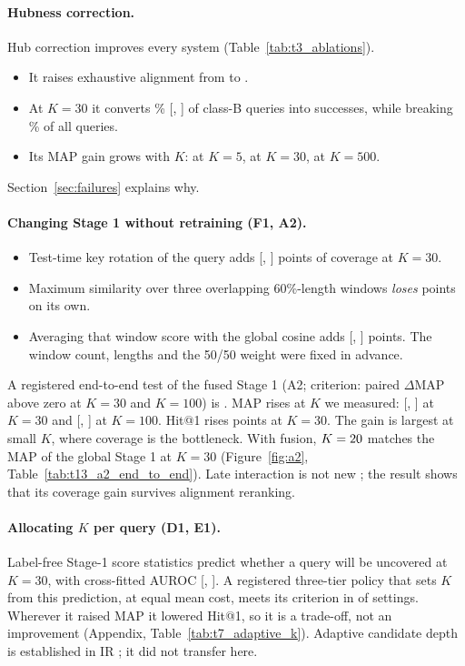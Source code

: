 \documentclass[10pt]{article}
\begin{document}
\paragraph{Hubness correction.} Hub correction improves every system (Table~\ref{tab:t3_ablations}).
\begin{itemize}
\item It raises exhaustive alignment from \ClassicalMap{} to \ClassicalHubMap.
\item At $K=30$ it converts \HubFixedShare\% [\HubFixedLo, \HubFixedHi] of class-B queries into successes, while breaking \HubBroken\% of all queries.
\item Its MAP gain grows with $K$: \HubGainFive{} at $K=5$, \HubGainThirty{} at $K=30$, \HubGainFiveHundred{} at $K=500$.
\end{itemize}
Section~\ref{sec:failures} explains why.

\paragraph{Changing Stage 1 without retraining (F1, A2).}
\begin{itemize}
\item Test-time key rotation of the query adds \FOneTtrThirty{} [\FOneTtrThirtyLo, \FOneTtrThirtyHi] points of coverage at $K=30$.
\item Maximum similarity over three overlapping 60\%-length windows \emph{loses} \FOneWinMaxThirty{} points on its own.
\item Averaging that window score with the global cosine adds \FOneFuseThirty{} [\FOneFuseThirtyLo, \FOneFuseThirtyHi] points. The window count, lengths and the 50/50 weight were fixed in advance.
\end{itemize}
A registered end-to-end test of the fused Stage 1 (A2; criterion: paired $\Delta$MAP above zero at $K=30$ and $K=100$) is \ATwoMeets.
MAP rises at \ATwoAllKPositive{} $K$ we measured: \ATwoApThirty{} [\ATwoApThirtyLo, \ATwoApThirtyHi] at $K=30$ and \ATwoApHundred{} [\ATwoApHundredLo, \ATwoApHundredHi] at $K=100$. Hit@1 rises \ATwoHitDThirty{} points at $K=30$.
The gain is largest at small $K$, where coverage is the bottleneck. With fusion, $K=20$ matches the MAP of the global Stage 1 at $K=30$ (Figure~\ref{fig:a2}, Table~\ref{tab:t13_a2_end_to_end}).
Late interaction is not new \citep{colbert,livi2026}; the result shows that its coverage gain survives alignment reranking.

\paragraph{Allocating $K$ per query (D1, E1).} Label-free Stage-1 score statistics predict whether a query will be uncovered at $K=30$, with cross-fitted AUROC \DOneAuroc{} [\DOneAurocLo, \DOneAurocHi].
A registered three-tier policy that sets $K$ from this prediction, at equal mean cost, meets its criterion in \EOneMeets{} of \EOneCells{} settings. Wherever it raised MAP it lowered Hit@1, so it is a trade-off, not an improvement (Appendix, Table~\ref{tab:t7_adaptive_k}). Adaptive candidate depth is established in IR \citep{culpepper2016}; it did not transfer here.
\end{document}
